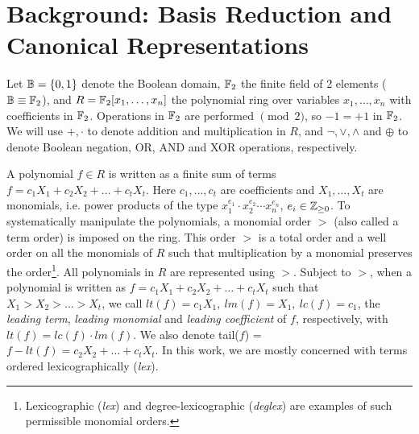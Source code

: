 \section{Background: \Grobner Basis Reduction and Canonical Representations}
\label{sec:prelim}




\par Let ${\mathbb{B}} =\{0,1\}$ denote the Boolean domain, ${\mathbb{F}}_2$ the finite field
of 2 elements (${\mathbb{B}} \equiv {\mathbb{F}}_2$), and $R = {\mathbb{F}}_2[x_1, \dots, x_n]$
the  polynomial ring over variables $x_1, \dots, x_n$ with
coefficients in ${\mathbb{F}}_2$.  
Operations in ${\mathbb{F}}_2$ are performed $\pmod{ 2}$, so $-1=+1$ in
${\mathbb{F}}_2$. We will use $+ ,\cdot$ to denote addition and multiplication in
$R$, and $\neg, \vee, \wedge$ and $\oplus$ to denote Boolean negation,
OR, AND and XOR operations, respectively. 

A polynomial $f \in R$ is written as a finite sum of terms 
$f = c_1 X_1 +  c_2 X_2 + \dots + c_t X_t$.  Here $c_1, \dots, c_t$
are coefficients and $X_1, \dots, X_t$ are monomials, i.e. power
products of the type $x_1^{e_{1}}\cdot x_2^{e_{2}}\cdots x_n^{e_{n}}$, 
$e_i \in {\mathbb{Z}}_{\geq  0}$. To systematically manipulate the
polynomials, a monomial order $>$ (also called a term order) is
imposed on the ring. This order $>$ is a total order and a well
order on all the monomials of $R$ such that multiplication by a
monomial preserves the order\footnote{Lexicographic ({\it lex}) and
  degree-lexicographic ({\it deglex}) are examples of such permissible
  monomial orders.}. All polynomials in $R$ are represented using
$>$. Subject to $>$, when a polynomial is written as 
$f = c_1 X_1 +  c_2 X_2 + \dots + c_t X_t$ 
 such that  $X_1 >X_2 > \dots >  X_t$, we call  $lt(f) = c_1 X_1,
 ~lm(f) = X_1, ~lc(f) = c_1$, the {\it leading   term}, {\it   leading
   monomial} and {\it   leading coefficient} of $f$,
 respectively, with $lt(f) = lc(f)\cdot lm(f)$. 
We also denote tail($f$) = $f - lt(f) = c_2X_2 + \dots + c_t X_t$. 
In this work, we are mostly concerned with terms ordered
lexicographically ({\it lex}). 

